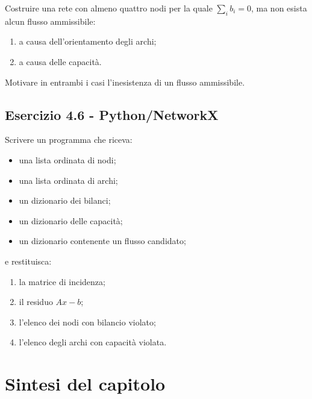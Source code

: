 \documentclass[11pt,a4paper]{article}
\begin{document}
Costruire una rete con almeno quattro nodi per la quale $\sum_i b_i=0$, ma non esista alcun flusso ammissibile:
\begin{enumerate}[label=(\alph*)]
  \item a causa dell'orientamento degli archi;
  \item a causa delle capacità.
\end{enumerate}
Motivare in entrambi i casi l'inesistenza di un flusso ammissibile.

\subsection*{Esercizio 4.6 - Python/NetworkX}

Scrivere un programma che riceva:
\begin{itemize}[nosep]
  \item una lista ordinata di nodi;
  \item una lista ordinata di archi;
  \item un dizionario dei bilanci;
  \item un dizionario delle capacità;
  \item un dizionario contenente un flusso candidato;
\end{itemize}
e restituisca:
\begin{enumerate}[label=(\alph*)]
  \item la matrice di incidenza;
  \item il residuo $Ax-b$;
  \item l'elenco dei nodi con bilancio violato;
  \item l'elenco degli archi con capacità violata.
\end{enumerate}

\section{Sintesi del capitolo}
\end{document}
